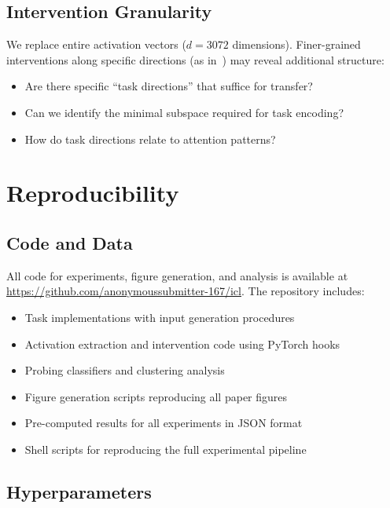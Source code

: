 \documentclass[runningheads]{llncs}
\begin{document}
\subsection{Intervention Granularity}

We replace entire activation vectors ($d=3072$ dimensions). Finer-grained interventions along specific directions (as in~\cite{todd2023function}) may reveal additional structure:
\begin{itemize}
    \item Are there specific ``task directions'' that suffice for transfer?
    \item Can we identify the minimal subspace required for task encoding?
    \item How do task directions relate to attention patterns?
\end{itemize}

\section{Reproducibility}
\label{app:reproducibility}

\subsection{Code and Data}

All code for experiments, figure generation, and analysis is available at \url{https://github.com/anonymoussubmitter-167/icl}. The repository includes:
\begin{itemize}
    \item Task implementations with input generation procedures
    \item Activation extraction and intervention code using PyTorch hooks
    \item Probing classifiers and clustering analysis
    \item Figure generation scripts reproducing all paper figures
    \item Pre-computed results for all experiments in JSON format
    \item Shell scripts for reproducing the full experimental pipeline
\end{itemize}

\subsection{Hyperparameters}
\end{document}
